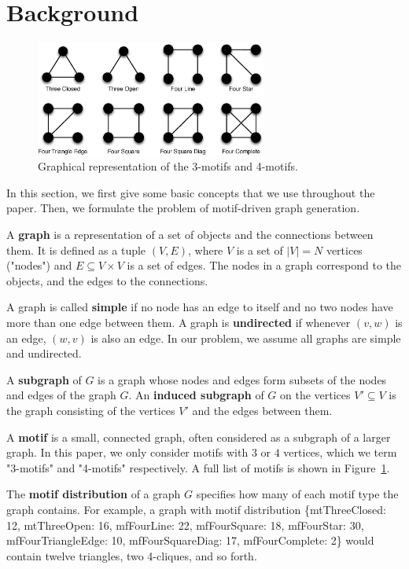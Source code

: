 \section{Background}
\label{sec:background}

\begin{figure}[t]
\centering
\includegraphics[width=3in]{Figures/motifs.eps}
\caption{Graphical representation of the 3-motifs and 4-motifs.}
\label{fig:motif}
\end{figure}

In this section, we first give some basic concepts that we use throughout the paper. Then, we formulate the problem of motif-driven graph generation. 

A \textbf{graph} is a representation of a set of objects and the
connections between them.  It is defined as a tuple $(V, E)$, where $V$ is
a set of $|V| = N$ vertices ("nodes") and $E \subseteq V \times V$ is a set of edges.
The nodes in a graph correspond to the objects, and the edges to
the connections.

A graph is called \textbf{simple} if no node has an edge to itself and no two
nodes have more than one edge between them.  A graph is \textbf{undirected}
if whenever $(v, w)$ is an edge, $(w, v)$ is also an edge.  In our problem, 
we assume all graphs are simple and undirected.

A \textbf{subgraph} of $G$ is a graph whose nodes and edges form subsets of 
the nodes and edges of the graph $G$.  An
\textbf{induced subgraph} of $G$ on the vertices $V' \subseteq V$ is the
graph consisting of the vertices $V'$ and the edges between them.

A \textbf{motif} is a small, connected graph, often considered as a
subgraph of a larger graph. In this paper, we only
consider motifs with $3$ or $4$ vertices, which we term "3-motifs" and
"4-motifs" respectively.  A full list of motifs is shown in
Figure~\ref{fig:motif}.

The \textbf{motif distribution} of a graph $G$ specifies how many of each
motif type the graph contains.  For example, a graph with motif
distribution \{mtThreeClosed: 12, mtThreeOpen: 16, mfFourLine: 22,
mfFourSquare: 18, mfFourStar: 30, mfFourTriangleEdge: 10, mfFourSquareDiag:
17, mfFourComplete: 2\} would contain twelve triangles, two 4-cliques, and
so forth.
